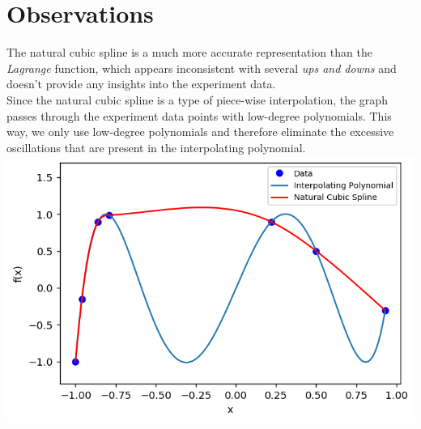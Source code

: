 \documentclass{article}
\begin{document}
\section{Observations}
The natural cubic spline is a much more accurate representation than the {\it Lagrange} function, which appears inconsistent with several {\it ups and downs} and doesn't provide any insights into the experiment data.\\

Since the natural cubic spline is a type of piece-wise interpolation, the graph passes through the experiment data points with low-degree polynomials. This way, we only use low-degree polynomials and therefore eliminate the excessive oscillations that are present in the interpolating polynomial.\\

\includegraphics[width=\textwidth,height=\textheight,keepaspectratio]{together.png}
\end{document}
